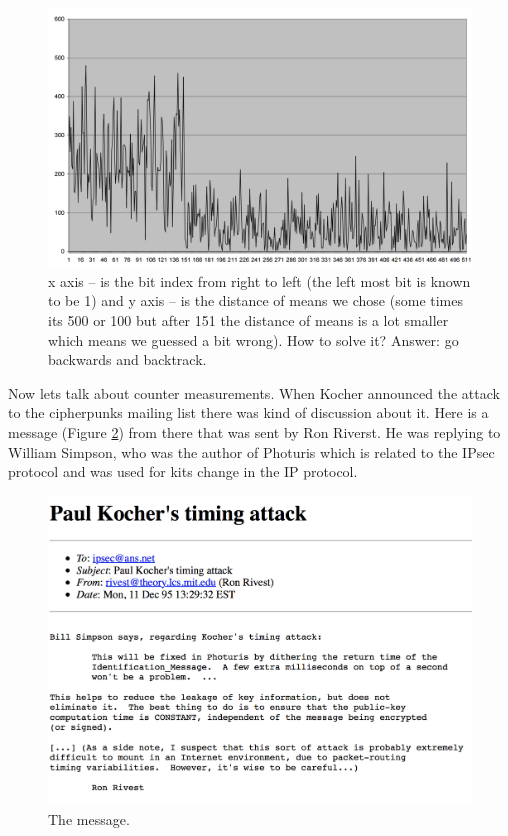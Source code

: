 \begin{figure}[H]
    \centering
    \includegraphics[scale=0.25]{images/figpita.png}
    \caption{x axis – is the bit index from right to left (the left most bit is known to be 1) and y axis – is the distance of means we chose (some times its 500 or 100 but after 151 the distance of means is a lot smaller which means we guessed a bit wrong). How to solve it? Answer: go backwards and backtrack.} \label{figpita:fig}
\end{figure}

Now lets talk about counter measurements. When Kocher announced the attack to the cipherpunks mailing list there was kind of discussion about it. Here is a message (Figure \ref{paul:fig}) from there that was sent by Ron Riverst. He was replying to William Simpson, who was the author of Photuris which is related to the IPsec protocol and was used for kits change in the IP protocol. 

\begin{figure}[H]
    \centering
    \includegraphics[scale=0.25]{images/paul.png}
    \caption{The message.} \label{paul:fig}
\end{figure}

